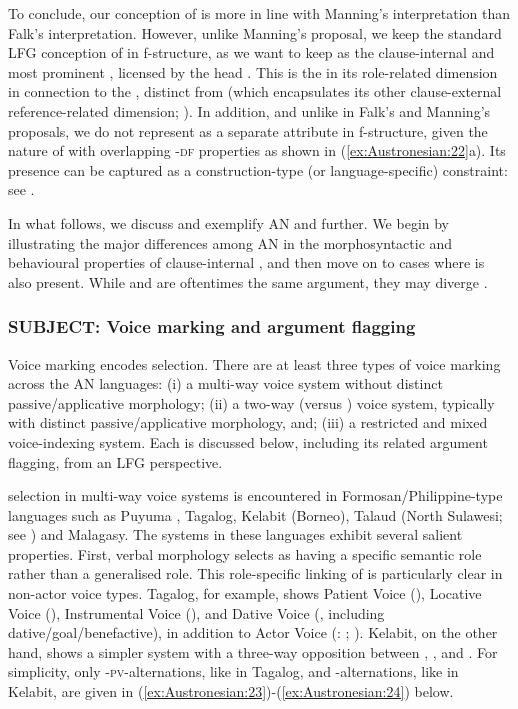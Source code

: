 \documentclass[output=paper,chinesefont]{../langscibook}
\begin{document}
To conclude, our conception of \PIVOT is more in line with Manning's interpretation than Falk's interpretation. However, unlike Manning's proposal, we keep the standard LFG conception of \SUBJ in f-structure, as we want to keep \SUBJ as the clause-internal and most prominent \GF, licensed by the head \PRED. This is the \SUBJ in its role-related dimension in connection to the \PRED, distinct from \PIVOT (which encapsulates its other clause-external reference-related dimension; \citealt{Schachter1977}). In addition, and unlike in Falk's and Manning's proposals, we do not represent \PIVOT as a separate attribute in f-structure, given the nature of \PIVOT with overlapping \GF-\textsc{df} properties as shown in (\ref{ex:Austronesian:22}a). Its presence can be captured as a construction-type (or language-specific) constraint: see .

In what follows, we discuss and exemplify AN \SUBJ and \PIVOT further. We begin by illustrating the major differences among AN in the morphosyntactic and behavioural properties of clause-internal \SUBJ, and then move on to cases where \PIVOT is also present. While \SUBJ and \PIVOT are oftentimes the same argument, they may diverge \citep{Arka2021}.

\largerpage
\subsubsection{SUBJECT: Voice marking and argument flagging}
\label{sec:Austronesian:4.1.1}

Voice marking encodes \SUBJ selection. There are at least three types of voice marking across the AN languages: (i) a multi-way voice system without distinct passive/applicative morphology; (ii) a two-way (\AV versus \UV) voice system, typically with distinct passive/applicative morphology, and; (iii) a restricted and mixed voice-indexing system. Each is discussed below, including its related argument flagging, from an LFG perspective.

\SUBJ selection in multi-way voice systems is encountered in Formosan{\slash}Philip\-pine-type languages such as Puyuma \citep{Teng2008}, Tagalog, Kelabit (Borneo), Talaud (North Sulawesi; see \citealt{Utsumi2013}) and Malagasy. The systems in these languages exhibit several salient properties. First, verbal morphology selects \SUBJ as having a specific semantic role rather than a generalised role. This role-specific linking of \SUBJ is particularly clear in non-actor voice types. Tagalog, for example, shows Patient Voice (\PV), Locative Voice (\LV), Instrumental Voice (\IV), and Dative Voice (\DV, including dative/goal/benefactive), in addition to Actor Voice (\AV: \citealt[135]{FoleyVanValin1984}; \citealt{Arka2003b}). Kelabit, on the other hand, shows a simpler system with a three-way opposition between \AV, \UV, and \IV. For simplicity, only \AV-\textsc{pv}-\LV alternations, like in Tagalog, and \AV-\PV alternations, like in Kelabit, are given in (\ref{ex:Austronesian:23})-(\ref{ex:Austronesian:24}) below.
\end{document}
